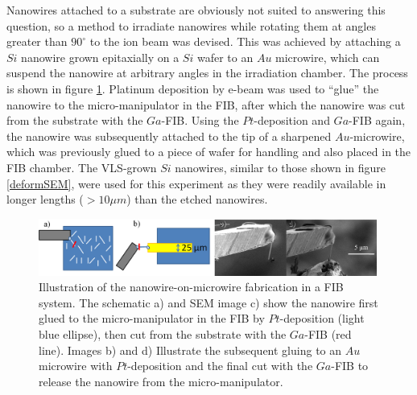 Nanowires attached to a substrate are obviously not suited to answering this question, so a method to irradiate nanowires while rotating them at angles greater than $90^\circ$ to the ion beam was devised. This was achieved by attaching a $Si$ nanowire grown epitaxially on a $Si$ wafer to an $Au$ microwire, which can suspend the nanowire at arbitrary angles in the irradiation chamber. The process is shown in figure \ref{reverseFIB}. Platinum deposition by e-beam was used to ``glue'' the nanowire to the micro-manipulator in the FIB, after which the nanowire was cut from the substrate with the $Ga$-FIB. Using the $Pt$-deposition and $Ga$-FIB again, the nanowire was subsequently attached to the tip of a sharpened $Au$-microwire, which was previously glued to a piece of wafer for handling and also placed in the FIB chamber. The VLS-grown $Si$ nanowires, similar to those shown in figure \ref{deformSEM}, were used for this experiment as they were readily available in longer lengths ($>10\mu m$) than the etched nanowires.

\begin{figure}[thbp]
	\centering
		\includegraphics[width=0.99\textwidth]{images/reverseFIB.jpg}
	\caption{Illustration of the nanowire-on-microwire fabrication in a FIB system. The schematic a) and SEM image c) show the nanowire first glued to the micro-manipulator in the FIB by $Pt$-deposition (light blue ellipse), then cut from the substrate with the $Ga$-FIB (red line). Images b) and d) Illustrate the subsequent gluing to an $Au$ microwire with $Pt$-deposition and the final cut with the $Ga$-FIB to release the nanowire from the micro-manipulator.}
	\label{reverseFIB}
\end{figure}

